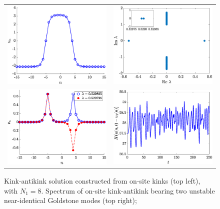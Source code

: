 \documentclass[12pt,reqno]{amsart}
\begin{document}
\begin{figure}[H]
	\begin{center}
	\begin{tabular}{cc}
	\includegraphics[width=6cm]{unstablekak.eps} &
	\includegraphics[width=6cm]{unstablekakspec.eps} \\
	\includegraphics[width=6cm]{unstablekakgoldstone.eps} &
	\includegraphics[width=6cm]{kakenergydiff.eps}
	\end{tabular}
	\end{center}
	\caption{Kink-antikink solution constructed from on-site kinks (top left), with $N_1 = 8$. Spectrum of on-site kink-antikink bearing two unstable near-identical Goldstone modes (top right);
}
\end{figure}
\end{document}

